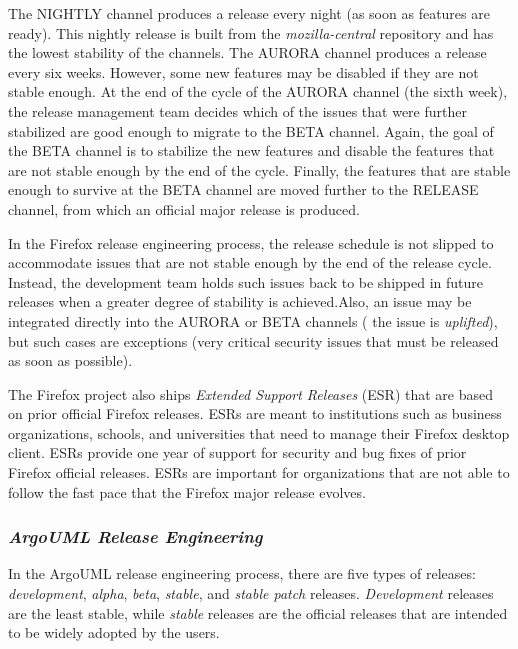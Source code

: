 The NIGHTLY channel produces a release every night (\ie as soon as features are
ready). This nightly release is built from the {\em mozilla-central} repository and has
the lowest stability of the
channels.
The AURORA channel produces a release every six weeks. However, some new
features may be disabled if they are not stable enough. At the end of the cycle
of the AURORA channel (the sixth week), the release management team decides which
of the issues that were further stabilized are good enough to migrate to the BETA
channel. Again, the goal of the BETA channel is to stabilize the new features
and disable the features that are not stable enough by the end of the cycle.
Finally, the features that are stable enough to survive at the BETA channel are
moved further to the RELEASE channel, from which an official major release is
produced.\footnotemark[18]

In the Firefox release engineering process, the release schedule is not slipped
to accommodate issues that are not stable enough by the end of the release
cycle. Instead, the development team holds such issues back to be shipped in
future releases when a greater degree of stability is achieved.\footnotemark[18]
Also, an issue may be integrated directly into the AURORA or BETA channels (\ie
the issue is {\em uplifted}), but such cases are exceptions (\eg very critical
security issues that must be released as soon as possible).\footnotemark[18] 

The Firefox project also ships {\em Extended Support Releases} (ESR) that are
based on prior official Firefox releases. ESRs are meant to institutions such as
business organizations, schools, and universities that need to manage their
Firefox desktop client. ESRs provide one year of support for security and bug
fixes of prior Firefox official releases. ESRs are important for organizations
that are not able to follow the fast pace that the Firefox major release
evolves.

\subsubsection*{\textbf{\textit{ArgoUML Release Engineering}}}\label{argouml:releng}

In the ArgoUML release engineering process, there are five types of releases:
{\em development}, {\em alpha}, {\em beta}, {\em stable}, and {\em stable patch}
releases. {\em Development} releases are the least stable, while {\em stable}
releases are the official releases that are intended to be widely adopted by the
users.

